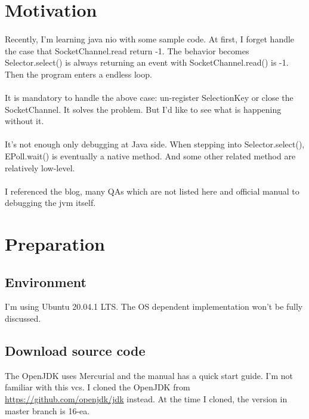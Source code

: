\documentclass[12pt]{article}
\begin{document}
\maketitle
\section{Motivation}
\paragraph{}
Recently, I'm learning java nio with some sample code. At first, I forget handle the case that SocketChannel.read return -1. The behavior becomes Selector.select() is always returning an event with SocketChannel.read() is -1. Then the program enters a endless loop.
\paragraph{}
It is mandatory to handle the above case: un-register SelectionKey or close the SocketChannel. It solves the problem. But I'd like to see what is happening without it.
\paragraph{}
It's not enough only debugging at Java side. When stepping into Selector.select(), EPoll.wait() is eventually a native method. And some other related method are relatively low-level.
\paragraph{}
I referenced the blog\cite{dbg-jdk-blog}, many QAs which are not listed here and official manual\cite{OpenJDK} to debugging the jvm itself.

\section{Preparation}
\subsection{Environment}
I'm using Ubuntu 20.04.1 LTS. The OS dependent implementation won't be fully discussed.
\subsection{Download source code}
The OpenJDK uses Mercurial and the manual has a quick start guide. I'm not familiar with this vcs. I cloned the OpenJDK from \url{https://github.com/openjdk/jdk} instead. At the time I cloned, the version in master branch is 16-ea.
\end{document}

